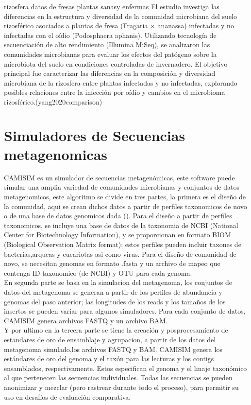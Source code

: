 rizosfera 
datos de fresas 
plantas sanasy enfermas 
El estudio investiga las diferencias en la estructura y diversidad de la comunidad microbiana del suelo rizosférico asociadas a plantas de fresa (Fragaria × ananassa) infectadas y no infectadas con el oídio (Podosphaera aphanis). Utilizando tecnología de secuenciación de alto rendimiento (Illumina MiSeq), se analizaron las comunidades microbianas para evaluar los efectos del patógeno sobre la microbiota del suelo en condiciones controladas de invernadero. El objetivo principal fue caracterizar las diferencias en la composición y diversidad microbiana de la rizosfera entre plantas infectadas y no infectadas, explorando posibles relaciones entre la infección por oídio y cambios en el microbioma rizosférico.(yang2020comparison)\\


\section{Simuladores de Secuencias metagenomicas}

CAMISIM es un simulador de secuencias metagenómicas, este software puede simular una amplia variedad de comunidades microbianas y conjuntos de datos metagenomicos, este algoritmo se divide en tres partes, la primera es el diseño de la comunidad, aqui se crean dichos datos a partir de perfiles taxonomicos de novo o de una base de datos genomicos dada (\cite{fritz2019camisim}). Para el diseño a partir de perfiles taxonomicos, se incluye una base de datos de la taxonomia de NCBI (National Center for Biotechnology Information), y se proporcionan en formato BIOM (Biological Observation Matrix format); estos perfiles pueden incluir taxones de bacterias,arqueas y eucariotas asi como virus. Para el diseño de comunidad de novo, se necesitan genomas en formato .fasta y un archivo de mapeo que contenga ID taxonomico (de NCBI) y OTU para cada genoma.  \\

En segunda parte se basa en la simulacion del metagenoma, los conjuntos de datos del metagenoma se generan a partir de los perfiles de abundancia y genomas del paso anterior; las longitudes de los reads y los tamaños de los insertos se pueden variar para algunos simuladores. Para cada conjunto de datos, CAMISIM genera archivos FASTQ y un archivo BAM.  \\

Y por ultimo en la tercera parte se tiene la creación y posprocesamiento de estandares de oro de ensamblaje y agrupacion, a partir de los datos del metagenoma simulado,los archivos FASTQ y BAM. CAMISIM genera los estándares de oro del genoma y el taxón para las lecturas y los contigs ensamblados, respectivamente. Estos especifican el genoma y el linaje taxonómico al que pertenecen las secuencias individuales. Todas las secuencias se pueden anonimizar y mezclar (pero rastrear durante todo el proceso), para permitir su uso en desafíos de evaluación comparativa.  \\

